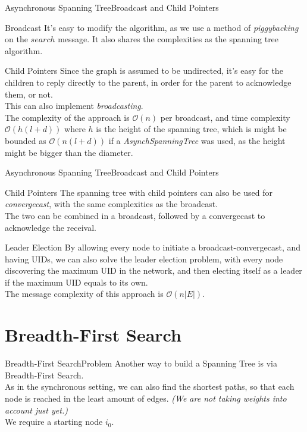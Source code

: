 \documentclass[pdf]{beamer}
\begin{document}
\begin{frame}{Asynchronous Spanning Tree}{Broadcast and Child Pointers}
    \begin{block}{Broadcast}
        It's easy to modify the algorithm, as we use a method of \emph{piggybacking} on the
        $search$ message. It also shares the complexities as the spanning tree algorithm.
    \end{block}
    \begin{block}{Child Pointers}
        Since the graph is assumed to be undirected, it's easy for the children to reply
        directly to the parent, in order for the parent to acknowledge them, or not.\\
        This can also implement \emph{broadcasting}.\\
        The complexity of the approach is $\mathcal{O}(n)$ per broadcast, and time complexity
        $\mathcal{O}(h(l+d))$ where $h$ is the height of the spanning tree, which is might be bounded
        as $\mathcal{O}(n(l+d))$ if a \emph{AsynchSpanningTree} was used, as the height might be bigger than the diameter. \\
    \end{block}
\end{frame}

\begin{frame}{Asynchronous Spanning Tree}{Broadcast and Child Pointers}
    \begin{block}{Child Pointers}
        The spanning tree with child pointers can also be used for \emph{convergecast}, with the same complexities as the broadcast.\\
        The two can be combined in a broadcast, followed by a convergecast to acknowledge the receival.
    \end{block}
    \begin{block}{Leader Election}
        By allowing every node to initiate a broadcast-convergecast, and having UIDs, we can also solve the leader election problem, with every node discovering the maximum UID in the network, and then electing itself as a leader if the maximum UID equals to its own.\\
        The message complexity of this approach is $\mathcal{O}(n|E|)$.
    \end{block}
\end{frame}

\section{Breadth-First Search}
\begin{frame}{Breadth-First Search}{Problem}
	Another way to build a Spanning Tree is via Breadth-First Search. \\
    \vspace{12pt}
    \pause
    As in the synchronous setting, we can also find the shortest paths, so that each node is reached in the least amount of edges. \emph{(We are not taking weights into account just yet.)} \\
    \vspace{12pt}
    \pause
    We require a starting node $i_0$.
\end{frame}
\end{document}
